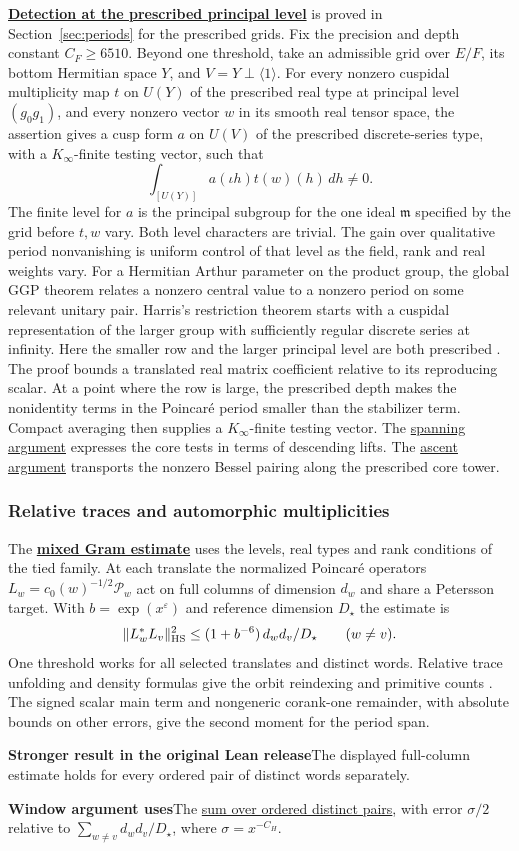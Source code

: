 \documentclass[11pt,a4paper]{article}
\newcommand{\rhscopelabel}[2]{%
  {\setlength{\fboxsep}{2pt}\colorbox{#1}{%
    \small\sffamily\bfseries\color{PageInk}#2}}}
\newcommand{\rhrange}[3][Stronger result in the original Lean release]{%
  \par\addvspace{.45\baselineskip}\Needspace{4\baselineskip}%
  \begingroup\setlength{\leftskip}{.65em}\setlength{\parindent}{0pt}%
  \noindent\rhscopelabel{TraceTint}{#1}\enspace#2\par
  \nobreak\smallskip
  \noindent\rhscopelabel{FieldTint}{Window argument uses}\enspace#3\par
  \endgroup\addvspace{.45\baselineskip}}
\begin{document}
\textbf{\hyperlink{candidate.fixed-level-period}{Detection at the prescribed principal level}}
is proved in Section~\ref{sec:periods} for the prescribed grids.
Fix the precision and depth constant \(C_F\ge6510\). Beyond one
threshold, take an admissible grid over \(E/F\), its bottom
Hermitian space \(Y\), and \(V=Y\perp\langle1\rangle\).
For every nonzero cuspidal multiplicity map \(t\) on \(U(Y)\) of the
prescribed real type at principal level \((g_0g_1)\), and every
nonzero vector \(w\) in its smooth real tensor space, the assertion
gives a cusp form \(a\) on \(U(V)\) of the prescribed discrete-series
type, with a \(K_\infty\)-finite testing vector, such that
\[
  \int_{[U(Y)]}a(\iota h)t(w)(h)\,dh\ne0 .
\]
The finite level for \(a\) is the principal subgroup for the one
ideal \(\mathfrak m\) specified by the grid before \(t,w\) vary.
Both level characters are trivial. The gain over qualitative
period nonvanishing is uniform control of that level as the field,
rank and real weights vary. For a Hermitian Arthur parameter on
the product group, the global GGP theorem relates a nonzero central
value to a nonzero period on some relevant unitary pair. Harris's
restriction theorem starts with a cuspidal representation of the
larger group with sufficiently regular discrete series at infinity.
Here the smaller row and the larger principal level are both prescribed
\cite{depth-endoscopic-ggp,depth-harris}. The proof bounds a translated
real matrix coefficient relative to its reproducing scalar. At a point
where the row is large, the prescribed depth makes the nonidentity
terms in the Poincar\'e period smaller than the stabilizer term.
Compact averaging then supplies a \(K_\infty\)-finite testing vector.
The \hyperlink{proof.principal-core-span}{spanning argument} expresses
the core tests in terms of descending lifts. The
\hyperlink{proof.principal-fixed-ascent}{ascent argument} transports
the nonzero Bessel pairing along the prescribed core tower.

\subsubsection*{Relative traces and automorphic multiplicities}
The \textbf{\hyperlink{candidate.trace}{mixed Gram estimate}} uses the levels,
real types and rank conditions of the tied family. At each translate the
normalized Poincar\'e operators \(L_w=c_0(w)^{-1/2}\mathcal P_w\) act on full
columns of dimension \(d_w\) and share a Petersson target. With
\(b=\exp(x^\varepsilon)\) and reference dimension \(D_\star\) the estimate is
\[
 \|L_w^*L_v\|_{\rm HS}^2
 \le (1+b^{-6})\,d_wd_v/D_\star
 \qquad(w\ne v).
\]
One threshold works for all selected translates and distinct words.
Relative trace unfolding and density formulas give the orbit reindexing
and primitive counts \cite{tr3getzhahn,tr3hironaka}. The signed scalar main
term and nongeneric corank-one remainder, with absolute bounds on other
errors, give the second moment for the period span.
\rhrange{The displayed full-column estimate holds for every ordered
pair of distinct words separately.}
{The \hyperlink{proof.summed-mixed-estimate}{sum over ordered distinct
pairs}, with error \(\sigma/2\) relative to
\(\sum_{w\ne v}d_wd_v/D_\star\), where \(\sigma=x^{-C_H}\).}
\end{document}
